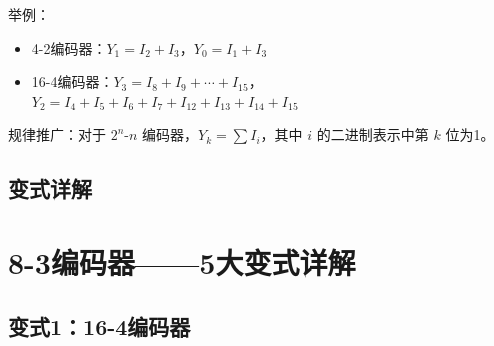 举例：
\begin{itemize}
  \item 4-2编码器：$Y_1 = I_2 + I_3$，$Y_0 = I_1 + I_3$
  \item 16-4编码器：$Y_3 = I_8 + I_9 + \cdots + I_{15}$，$Y_2 = I_4 + I_5 + I_6 + I_7 + I_{12} + I_{13} + I_{14} + I_{15}$
\end{itemize}

规律推广：对于 $2^n$-$n$ 编码器，$Y_k = \sum I_i$，其中 $i$ 的二进制表示中第 $k$ 位为1。

\section{变式详解}
\chapter{8-3编码器——5大变式详解}

\section{变式1：16-4编码器}


